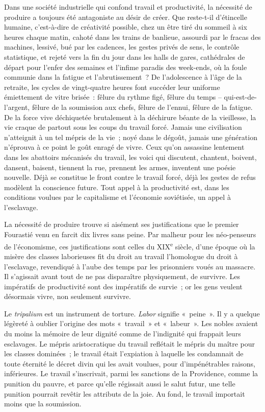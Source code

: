 \documentclass[french,twoside]{book} %
\begin{document}
\noindent Dans une société industrielle qui confond travail et productivité, la nécessité de produire a toujours été antagoniste au désir de créer. Que reste-t-il d’étincelle humaine, c’est-à-dire de créativité possible, chez un être tiré du sommeil à six heures chaque matin, cahoté dans les trains de banlieue, assourdi par le fracas des machines, lessivé, bué par les cadences, les gestes privés de sens, le contrôle statistique, et rejeté vers la fin du jour dans les halls de gares, cathédrales de départ pour l’enfer des semaines et l’infime paradis des week-ends, où la foule communie dans la fatigue et l’abrutissement ? De l’adolescence à l’âge de la retraite, les cycles de vingt-quatre heures font succéder leur uniforme émiettement de vitre brisée : fêlure du rythme figé, fêlure du temps – qui-est-de-l’argent, fêlure de la soumission aux chefs, fêlure de l’ennui, fêlure de la fatigue. De la force vive déchiquetée brutalement à la déchirure béante de la vieillesse, la vie craque de partout sous les coups du travail forcé. Jamais une civilisation n’atteignit à un tel mépris de la vie ; noyé dans le dégoût, jamais une génération n’éprouva à ce point le goût enragé de vivre. Ceux qu’on assassine lentement dans les abattoirs mécanisés du travail, les voici qui discutent, chantent, boivent, dansent, baisent, tiennent la rue, prennent les armes, inventent une poésie nouvelle. Déjà se constitue le front contre le travail forcé, déjà les gestes de refus modèlent la conscience future. Tout appel à la productivité est, dans les conditions voulues par le capitalisme et l’économie soviétisée, un appel à l’esclavage.\par
La nécessité de produire trouve si aisément ses justifications que le premier Fourastié venu en farcit dix livres sans peine. Par malheur pour les néo-penseurs de l’économisme, ces justifications sont celles du XIX\textsuperscript{e} siècle, d’une époque où la misère des classes laborieuses fit du droit au travail l’homologue du droit à l’esclavage, revendiqué à l’aube des temps par les prisonniers voués au massacre. Il s’agissait avant tout de ne pas disparaître physiquement, de survivre. Les impératifs de productivité sont des impératifs de survie ; or les gens veulent désormais vivre, non seulement survivre.\par
Le \emph{tripalium} est un instrument de torture. \emph{Labor} signifie « peine ». Il y a quelque légèreté à oublier l’origine des mots « travail » et « labeur ». Les nobles avaient du moins la mémoire de leur dignité comme de l’indignité qui frappait leurs esclavages. Le mépris aristocratique du travail reflétait le mépris du maître pour les classes dominées ; le travail était l’expiation à laquelle les condamnait de toute éternité le décret divin qui les avait voulues, pour d’impénétrables raisons, inférieures. Le travail s’inscrivait, parmi les sanctions de la Providence, comme la punition du pauvre, et parce qu’elle régissait aussi le salut futur, une telle punition pourrait revêtir les attributs de la joie. Au fond, le travail importait moins que la soumission.\par
\end{document}
